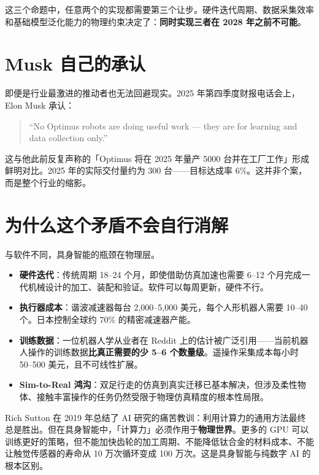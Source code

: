 这三个命题中，任意两个的实现都需要第三个让步。硬件迭代周期、数据采集效率和基础模型泛化能力的物理约束决定了：\textbf{同时实现三者在 2028 年之前不可能}。

\section{Musk 自己的承认}

即便是行业最激进的推动者也无法回避现实。2025 年第四季度财报电话会上，Elon Musk 承认\cite{tesla2025q4}：

\begin{quote}
``No Optimus robots are doing useful work --- they are for learning and data collection only.''
\end{quote}

这与他此前反复声称的「Optimus 将在 2025 年量产 5000 台并在工厂工作」形成鲜明对比。2025 年的实际交付量约为 300 台\cite{electrek2025optimus}——目标达成率 6\%。这并非个案，而是整个行业的缩影。

\section{为什么这个矛盾不会自行消解}

与软件不同，具身智能的瓶颈在物理层。

\begin{itemize}
  \item \textbf{硬件迭代}：传统周期 18--24 个月，即使借助仿真加速也需要 6--12 个月完成一代机械设计的加工、装配和验证\cite{humanoid2026hmnd}。软件可以每周更新，硬件不行。
  \item \textbf{执行器成本}：谐波减速器每台 2,000--5,000 美元，每个人形机器人需要 10--40 个\cite{techticker2026harmonic}。日本控制全球约 70\% 的精密减速器产能。
  \item \textbf{训练数据}：一位机器人学从业者在 Reddit 上的估计被广泛引用——当前机器人操作的训练数据\textbf{比真正需要的少 5--6 个数量级}\cite{reddit2025roboticsdata}。遥操作采集成本每小时 50--500 美元，且不可线性扩展。
  \item \textbf{Sim-to-Real 鸿沟}：双足行走的仿真到真实迁移已基本解决，但涉及柔性物体、接触丰富操作的任务仍然受限于物理仿真精度的根本性局限\cite{aljalbout2026realitygap}。
\end{itemize}

\begin{warnbox}
Rich Sutton 在 2019 年总结了 AI 研究的痛苦教训：利用计算力的通用方法最终总是胜出\cite{sutton2019bitterlesson}。但在具身智能中，「计算力」必须作用于\textbf{物理世界}。更多的 GPU 可以训练更好的策略，但不能加快齿轮的加工周期、不能降低钛合金的材料成本、不能让触觉传感器的寿命从 10 万次循环变成 100 万次。这是具身智能与纯数字 AI 的根本区别。
\end{warnbox}
